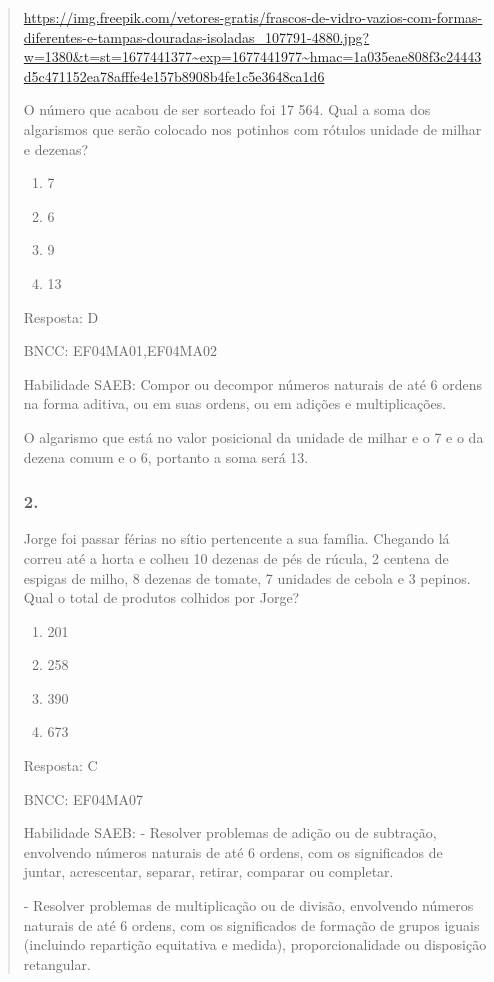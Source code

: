 \begin{enumerate}
\begin{escolha}
\begin{enumerate}
\begin{itemize}
\begin{itemize}
\begin{escolha}
\begin{quote}
\begin{escolha}
{\url{https://img.freepik.com/vetores-gratis/frascos-de-vidro-vazios-com-formas-diferentes-e-tampas-douradas-isoladas_107791-4880.jpg?w=1380\&t=st=1677441377~exp=1677441977~hmac=1a035eae808f3c24443d5c471152ea78afffe4e157b8908b4fe1c5e3648ca1d6}

O número que acabou de ser sorteado foi 17 564. Qual a soma dos
algarismos que serão colocado nos potinhos com rótulos unidade de milhar
e dezenas?

\begin{enumerate}
\def\labelenumi{\alph{enumi})}
\item
  7
\item
  6
\item
  9
\item
  13
\end{enumerate}

Resposta: D

BNCC: EF04MA01,EF04MA02

Habilidade SAEB: Compor ou decompor números naturais de até 6 ordens na
forma aditiva, ou em suas ordens, ou em adições e multiplicações.

O algarismo que está no valor posicional da unidade de milhar e o 7 e o
da dezena comum e o 6, portanto a soma será 13.

\subsubsection{2. }\label{section-188}

Jorge foi passar férias no sítio pertencente a sua família. Chegando lá
correu até a horta e colheu 10 dezenas de pés de rúcula, 2 centena de
espigas de milho, 8 dezenas de tomate, 7 unidades de cebola e 3 pepinos.
Qual o total de produtos colhidos por Jorge?

\begin{enumerate}
\def\labelenumi{\alph{enumi})}
\item
  201
\item
  258
\item
  390
\item
  673
\end{enumerate}

Resposta: C

BNCC: EF04MA07

Habilidade SAEB: - Resolver problemas de adição ou de subtração,
envolvendo números naturais de até 6 ordens, com os significados de
juntar, acrescentar, separar, retirar, comparar ou completar.

- Resolver problemas de multiplicação ou de divisão, envolvendo números
naturais de até 6 ordens, com os significados de formação de grupos
iguais (incluindo repartição equitativa e medida), proporcionalidade ou
disposição retangular.

}
\end{escolha}
\end{quote}
\end{escolha}
\end{itemize}
\end{itemize}
\end{enumerate}
\end{escolha}
\end{enumerate}
